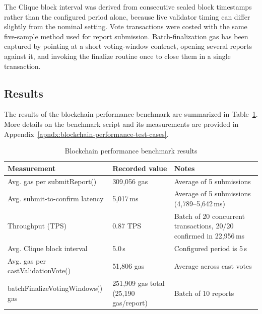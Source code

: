 The Clique block interval was derived from consecutive sealed block timestamps rather than the configured period alone, because live validator timing can differ slightly from the nominal setting. Vote transactions were costed with the same five-sample method used for report submission. Batch-finalization gas has been captured by pointing at a short voting-window contract, opening several reports against it, and invoking the finalize routine once to close them in a single transaction.

\subsection{Results}

The results of the blockchain performance benchmark are summarized in Table~\ref{tab:performance-results}. More details on the benchmark script and its measurements are provided in Appendix~\ref{apndx:blockchain-performance-test-cases}.

\begin{table}[htbp]
\centering
\caption{Blockchain performance benchmark results}
\label{tab:performance-results}
\begin{tabular}{p{}|p{}|p{}}
    
    Measurement & Recorded value & Notes \\
    \hline
    Avg. gas per  {submitReport()} & 309{,}056 gas & Average of 5 submissions \\
    \hline
    Avg. submit-to-confirm latency & 5{,}017\,ms & Average of 5 submissions (4{,}789--5{,}642\,ms) \\
    \hline
    Throughput (TPS) & 0.87 TPS & Batch of 20 concurrent transactions, 20/20 confirmed in 22{,}956\,ms \\
    \hline
    Avg. Clique block interval & 5.0\,s & Configured period is 5\,s \\
    \hline
    Avg. gas per  {castValidationVote()} & 51{,}806 gas & Average across cast votes \\
    \hline
     {batchFinalizeVotingWindows()} gas & 251{,}909 gas total (25{,}190 gas/report) & Batch of 10 reports \\
    
\end{tabular}
\end{table}

